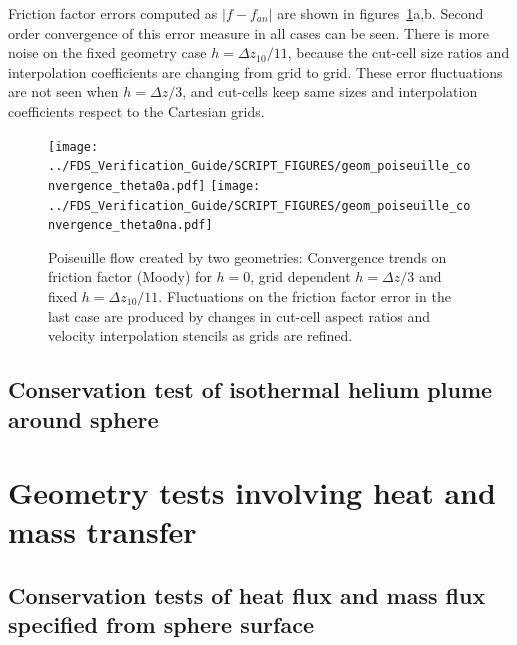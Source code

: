 \documentclass[11pt]{book}
\begin{document}
Friction factor errors computed as $|f-f_{an}|$ are shown in figures~\ref{Fig:PoiseConvg}a,b. Second order convergence of this error measure in all cases can be seen.
There is more noise on the fixed geometry case $h=\Delta z_{10}/11$, because the cut-cell size ratios and interpolation coefficients are changing from grid to grid. These error fluctuations are not seen when $h=\Delta z /3$, and cut-cells keep same sizes and interpolation coefficients respect to the Cartesian grids.
%
\begin{figure}[h]
      \centering
      \texttt{[image: ../FDS\_Verification\_Guide/SCRIPT\_FIGURES/geom\_poiseuille\_convergence\_theta0a.pdf]}
      \texttt{[image: ../FDS\_Verification\_Guide/SCRIPT\_FIGURES/geom\_poiseuille\_convergence\_theta0na.pdf]}
      \caption{Poiseuille flow created by two geometries: Convergence trends on friction factor (Moody) for $h=0$, grid dependent $h=\Delta z/3$ and fixed $h=\Delta z_{10}/11$. Fluctuations on the friction factor error in the last case are produced by changes in cut-cell aspect ratios and velocity interpolation stencils as grids are refined.}
      \label{Fig:PoiseConvg}
\end{figure}
%


\subsection{Conservation test of isothermal helium plume around sphere}



\section{Geometry tests involving heat and mass transfer}


\subsection{Conservation tests of heat flux and mass flux specified from sphere surface}

\end{document}
